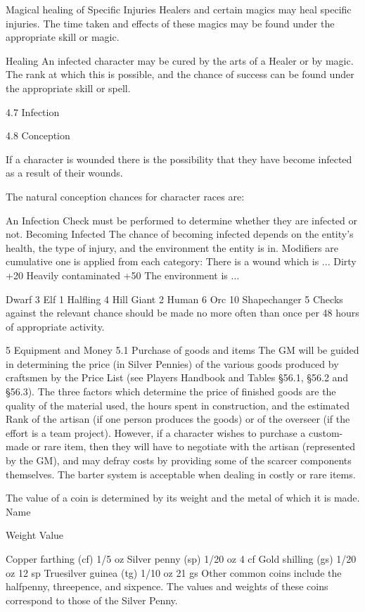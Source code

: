 \documentclass[a4paper]{article}
\begin{document}
\begin{multicols}{3}
Magical healing of Specific Injuries Healers and
certain magics may heal specific injuries. The time
taken and effects of these magics may be found
under the appropriate skill or magic.

Healing An infected character may be cured by the
arts of a Healer or by magic. The rank at which this
is possible, and the chance of success can be found
under the appropriate skill or spell.

4.7 Infection

4.8 Conception

If a character is wounded there is the possibility
that they have become infected as a result of their
wounds.

The natural conception chances for character races
are:

An Infection Check must be performed to determine whether they are infected or not.
Becoming Infected
The chance of becoming infected depends on the
entity’s health, the type of injury, and the environment the entity is in. Modifiers are cumulative one
is applied from each category:
There is a wound which is ...
Dirty
+20%
Heavily contaminated +50%
The environment is ...

Dwarf
3%
Elf
1%
Halﬂing
4%
Hill Giant
2%
Human
6%
Orc
10%
Shapechanger 5%
Checks against the relevant chance should be made
no more often than once per 48 hours of appropriate activity.

5 Equipment and Money
5.1 Purchase of goods and items
The GM will be guided in determining the price (in
Silver Pennies) of the various goods produced by
craftsmen by the Price List (see Players Handbook
and Tables §56.1, §56.2 and §56.3). The three
factors which determine the price of finished goods
are the quality of the material used, the hours spent
in construction, and the estimated Rank of the
artisan (if one person produces the goods) or of the
overseer (if the effort is a team project). However,
if a character wishes to purchase a custom-made or
rare item, then they will have to negotiate with the
artisan (represented by the GM), and may defray
costs by providing some of the scarcer components
themselves. The barter system is acceptable when
dealing in costly or rare items.

The value of a coin is determined by its weight and
the metal of which it is made.
Name

Weight Value

Copper farthing (cf) 1/5 oz
Silver penny (sp)
1/20 oz 4 cf
Gold shilling (gs)
1/20 oz 12 sp
Truesilver guinea (tg) 1/10 oz 21 gs
Other common coins include the halfpenny, threepence, and sixpence. The values and weights of
these coins correspond to those of the Silver
Penny.


\end{multicols}
\end{document}

